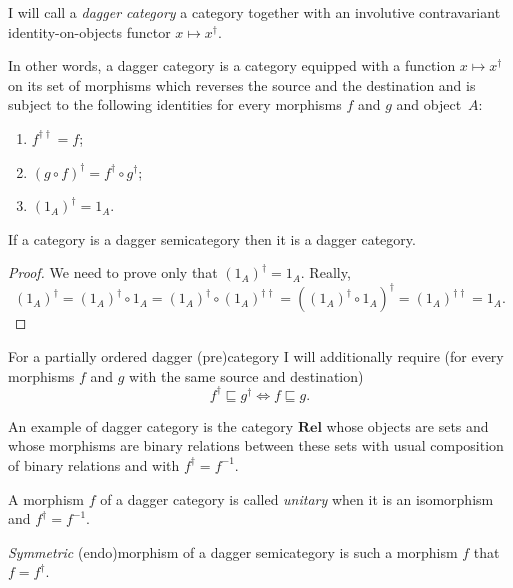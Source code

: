 \begin{defn}
I will call a \emph{dagger category} a category
together with an involutive contravariant identity-on-objects functor
$x\mapsto x^{\dagger}$.

In other words, a dagger category is a category equipped with a function
$x\mapsto x^{\dagger}$ on its set of morphisms which reverses the
source and the destination and is subject to the following identities
for every morphisms $f$ and $g$ and object~$A$:
\begin{enumerate}
\item $f^{\dagger\dagger}=f$;
\item $(g\circ f)^{\dagger}=f^{\dagger}\circ g^{\dagger}$;
\item $(1_{A})^{\dagger}=1_{A}$.
\end{enumerate}
\end{defn}
\begin{thm}
If a category is a dagger semicategory then it is a dagger category.\end{thm}
\begin{proof}
We need to prove only that $(1_{A})^{\dagger}=1_{A}$. Really,
\[
(1_{A})^{\dagger}=(1_{A})^{\dagger}\circ1_{A}=(1_{A})^{\dagger}\circ(1_{A})^{\dagger\dagger}=((1_{A})^{\dagger}\circ1_{A})^{\dagger}=(1_{A})^{\dagger\dagger}=1_{A}.
\]

\end{proof}
For a partially ordered dagger (pre)category I will additionally require
(for every morphisms $f$ and $g$ with the same source and destination)
\[
f^{\dagger}\sqsubseteq g^{\dagger}\Leftrightarrow f\sqsubseteq g.
\]


An example of dagger category is the category $\mathbf{Rel}$ whose
objects are sets and whose morphisms are binary relations between
these sets with usual composition of binary relations and with $f^{\dagger}=f^{-1}$.
\begin{defn}
A morphism $f$ of a dagger category is called
\emph{unitary} when it is an isomorphism and $f^{\dagger}=f^{-1}$.
\end{defn}

\begin{defn}
\emph{Symmetric} (endo)morphism of a dagger
semicategory is such a morphism $f$ that $f=f^{\dagger}$.
\end{defn}

